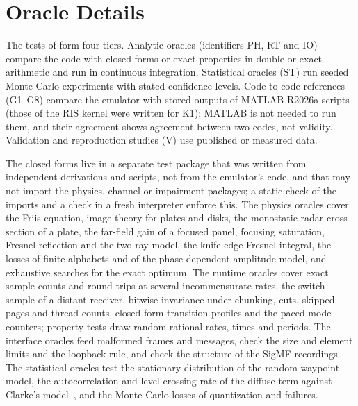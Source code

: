 \section{Oracle Details}\label{app:oracles}
The tests of \sremu{} form four tiers. Analytic oracles (identifiers PH,
RT and IO) compare the code with closed forms or exact properties in double or exact
arithmetic and run in continuous integration. Statistical oracles (ST) run seeded Monte Carlo
experiments with stated confidence levels. Code-to-code references (G1--G8) compare the
emulator with stored outputs of MATLAB R2026a scripts (those of the RIS kernel were written
for K1); MATLAB is not needed to run them, and their agreement shows agreement between two
codes, not validity.
Validation and reproduction studies (V) use published or measured data.

The closed forms live in a separate test package that was
written from independent derivations and scripts, not from the emulator's code, and that may
not import the physics, channel or impairment packages; a static check of the imports and a
check in a fresh interpreter enforce this. The physics oracles cover the Friis equation, image
theory for plates and disks, the monostatic radar cross section of a plate, the
far-field gain of a focused panel, focusing saturation, Fresnel reflection and the two-ray
model, the knife-edge Fresnel integral, the losses of finite alphabets and of the
phase-dependent amplitude model, and exhaustive searches for the exact optimum. The runtime
oracles cover exact sample counts and round trips at several incommensurate rates, the switch
sample of a distant receiver, bitwise invariance under chunking, cuts, skipped pages and
thread counts, closed-form transition profiles and the paced-mode counters; property tests
draw random rational rates, times and periods. The interface oracles feed malformed frames
and messages, check the size and element limits and the loopback rule, and check the
structure of the SigMF recordings. The statistical oracles test the stationary distribution
of the random-waypoint model, the autocorrelation and level-crossing rate of the diffuse term
against Clarke's model~\cite{Clarke1968}, and the Monte Carlo losses of quantization and
failures.

